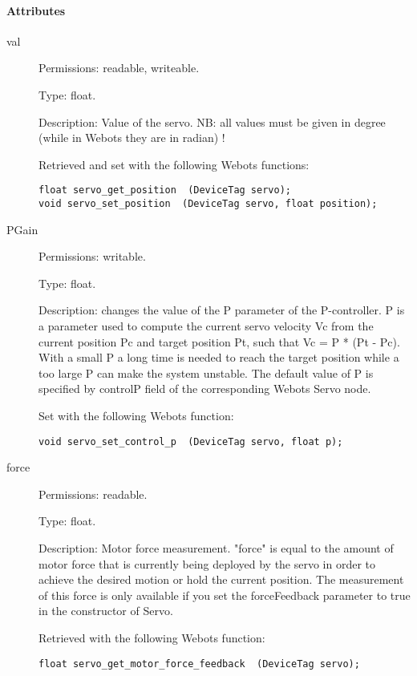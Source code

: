 \paragraph{Attributes}
\label{webots.uobjects.robotdevices.servo.attributes}%

\noindent
\begin{description}
\item[{         val
 }]            Permissions: readable, writeable.


 Type: float.


 Description: Value of the servo. NB: all values must be given in
 degree (while in Webots they are in radian) !


          Retrieved and set with the following Webots functions:


\begin{lstlisting}[firstnumber=1,]
float servo_get_position  (DeviceTag servo);
void servo_set_position  (DeviceTag servo, float position);
\end{lstlisting}
\item[{         PGain
 }]            Permissions: writable.


 Type: float.


 Description: changes the value of the P parameter of the
 P-{}controller. P is a parameter used to compute the current servo
 velocity Vc from the current position Pc and target position Pt, such
 that Vc = P * (Pt -{} Pc).  With a small P a long time is needed to
 reach the target position while a too large P can make the system
 unstable.  The default value of P is specified by controlP field of
 the corresponding Webots Servo node.


          Set with the following Webots function:


\begin{lstlisting}[firstnumber=1,]
void servo_set_control_p  (DeviceTag servo, float p);
\end{lstlisting}
\item[{         force
 }]            Permissions: readable.


 Type: float.


 Description: Motor force measurement. "force" is equal to the amount
 of motor force that is currently being deployed by the servo in order
 to achieve the desired motion or hold the current position.  The
 measurement of this force is only available if you set the
 forceFeedback parameter to true in the constructor of Servo.


          Retrieved with the following Webots function:


\begin{lstlisting}[firstnumber=1,]
float servo_get_motor_force_feedback  (DeviceTag servo);
\end{lstlisting}
\end{description}

